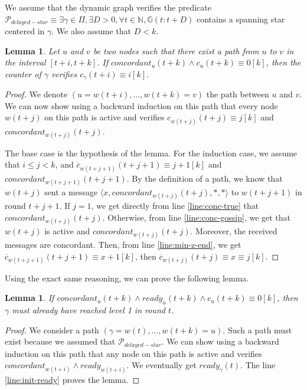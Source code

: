 \documentclass[11pt,letterpaper]{article}
\newtheorem{lem}[thm]{Lemma}
\newcommand{\cent}{\gamma}
\begin{document}
We assume that the dynamic graph verifies the predicate $\mathcal{P}_{delayed-star} \equiv \exists \cent \in \Pi, \exists D > 0, \forall t \in \mathds{N}, \mathds{G}(t:t+D)$
contains a spanning star centered in $\cent$. We also assume that $D < k$.


\begin{lem} \label{lem:conc-safety}
	Let $u$ and $v$ be two nodes such that there exist a path from $u$ to $v$ in the interval $[t+i,t+k]$.
	If $concordant_u(t+k) \wedge c_u(t+k) \equiv 0 [k]$, then the counter of $\cent$ verifies $c_\cent(t+i) \equiv i [k]$.
\end{lem}
\begin{proof}
	We denote $(u = w(t+i), \dots, w(t+k) = v)$ the path between $u$ and $v$.
	We can now show using a backward induction on this path that every node $w(t+j)$ on this path is active and verifies $c_{w(t+j)}(t+j) \equiv j [k]$ and $concordant_{w(t+j)}(t+j)$.

	The base case is the hypothesis of the lemma.
	For the induction case, we assume that $i \leq j < k$, and $\overline{c}_{w(t+j+1)}(t+j+1) \equiv j+1 [k]$ and $concordant_{w(t+j+1)}(t+j+1)$.
	By the definition of a path, we know that $w(t+j)$ sent a message $\langle x, concordant_{w(t+j)}(t+j), *, * \rangle$ to $w(t+j+1)$ in round $t+j+1$.
	If $j = 1$, we get directly from line \ref{line:conc-true} that $concordant_{w(t+j)}(t+j)$.
	Otherwise, from line \ref{line:conc-gossip}, we get that $w(t+j)$ is active and $concordant_{w(t+j)}(t+j)$. Moreover, the received messages are concordant.
	Then, from line \ref{line:min-z-end}, we get $\overline{c}_{w(t+j+1)}(t+j+1) \equiv x+1 [k]$, then $\overline{c}_{w(t+j)}(t+j) \equiv x \equiv j [k]$.
\end{proof}

\noindent Using the exact same reasoning, we can prove the following lemma.
\begin{lem} \label{lem:conc-safety-bis}
	If $concordant_u(t+k) \wedge ready_u(t+k) \wedge c_u(t+k) \equiv 0 [k]$, then $\cent$ must already have reached level 1 in round $t$.
\end{lem}
\begin{proof}
	We consider a path $(\cent = w(t), \dots, w(t+k) = u)$. Such a path must exist because we assumed that $\mathcal{P}_{delayed-star}$.
	We can show using a backward induction on this path that any node on this path is active and verifies $concordant_{w(t+i)} \wedge ready_{w(t+i)}$.
	We eventually get $ready_\cent(t)$. The line \ref{line:init-ready} proves the lemma.
\end{proof}
\end{document}
